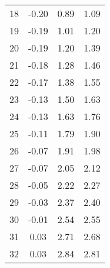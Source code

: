 \begin{longtable}[c]{cccc}
	18                       & -0.20                                & 0.89                                 & 1.09                       \\
	19                       & -0.19                                & 1.01                                 & 1.20                       \\
	20                       & -0.19                                & 1.20                                 & 1.39                       \\
	21                       & -0.18                                & 1.28                                 & 1.46                       \\
	22                       & -0.17                                & 1.38                                 & 1.55                       \\
	23                       & -0.13                                & 1.50                                 & 1.63                       \\
	24                       & -0.13                                & 1.63                                 & 1.76                       \\
	25                       & -0.11                                & 1.79                                 & 1.90                       \\
	26                       & -0.07                                & 1.91                                 & 1.98                       \\
	27                       & -0.07                                & 2.05                                 & 2.12                       \\
	28                       & -0.05                                & 2.22                                 & 2.27                       \\
	29                       & -0.03                                & 2.37                                 & 2.40                       \\
	30                       & -0.01                                & 2.54                                 & 2.55                       \\
	31                       & 0.03                                 & 2.71                                 & 2.68                       \\
	32                       & 0.03                                 & 2.84                                 & 2.81                       \\

\end{longtable}
